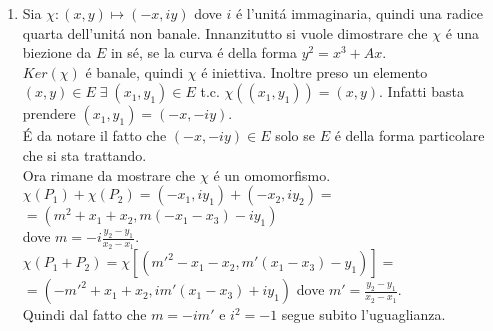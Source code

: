 \documentclass[a4paper]{article}
\newcommand{\ds}{\displaystyle}
\begin{document}
\begin{enumerate}
\begin{enumerate}
Ora rimane da mostrare che $\psi$ \'e un omomorfismo.\\
$\psi(P_1)+\psi(P_2)=(\zeta x_1,-y_1)+(\zeta x_2,-y_2)=$
$=(m^2-\zeta x_1-\zeta x_2,m(\zeta x_1-x_3)+y_1)$\\
dove $\ds{m=-\frac{y_2-y_1}{\zeta(x_2-x_1)}=-\zeta^2\frac{y_2-y_1}{x_2-x_1}}$.\\
$\psi(P_1+P_2)=\psi[(m'^2-x_1-x_2,m'(x_1-x_3)-y_1)]=$\\
$=(\zeta m'^2- \zeta x_1- \zeta x_2,-m'(x_1-x_3)+y_1)$ dove $\ds{m'=\frac{y_2-y_1}{x_2-x_1}}$.\\
Quindi dal fatto che $m=-\zeta^2 m'$ e $\zeta^3=1$ segue subito l'uguaglianza.\\

\item Sia $\chi: (x,y) \longmapsto (-x,iy)$ dove $i$ \'e l'unit\'a immaginaria, quindi una radice quarta dell'unit\'a non banale. Innanzitutto si vuole dimostrare che $\chi$ \'e una biezione da $E$ in s\'e, se la curva \'e della forma $y^2=x^3+Ax$.\\
$Ker(\chi)$ \'e banale, quindi $\chi$ \'e iniettiva. Inoltre preso un elemento $(x,y)\in E \;\exists\;
(x_1,y_1)\in E$ t.c. $\chi((x_1,y_1))=(x,y)$. Infatti basta prendere $(x_1,y_1)=(-x,- i 
y)$.\\
\'E da notare il fatto che $(-x,-iy)\in E$ solo se $E$ \'e della forma particolare che si sta trattando.\\
Ora rimane da mostrare che $\chi$ \'e un omomorfismo.\\
$\chi(P_1)+\chi(P_2)=(-x_1,iy_1)+(-x_2,iy_2)=$
$=(m^2+x_1+x_2,m(-x_1-x_3)-iy_1)$\\
dove $\ds{m=-i\frac{y_2-y_1}{x_2-x_1}}$.\\
$\chi(P_1+P_2)=\chi[(m'^2-x_1-x_2,m'(x_1-x_3)-y_1)]=$\\
$=(-m'^2+x_1+x_2,im'(x_1-x_3)+iy_1)$ dove $\ds{m'=\frac{y_2-y_1}{x_2-x_1}}$.\\
Quindi dal fatto che $m=-im'$ e $i^2=-1$ segue subito l'uguaglianza.\\

\end{enumerate}



\end{enumerate}
\end{document}
